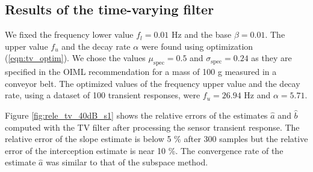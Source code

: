\subsection{Results of the time-varying filter}

We fixed the frequency lower value $f_l=0.01$ Hz and the base $\beta = 0.01$. 
The upper value $f_u$ and the decay rate $\alpha$ were found using optimization (\ref{eqn:tv_optim}). 
We chose the values $\mu_{\mathrm{spec}}=0.5$ and $\sigma_{\mathrm{spec}}=0.24$ as they are specified in the OIML recommendation \cite{OIML_R51_1} for a mass of 100 g measured in a conveyor belt.
The optimized values of the frequency upper value and the decay rate, using a dataset of 100 transient responses, were $f_u = 26.94$ Hz and $\alpha = 5.71$.

Figure \ref{fig:rele_tv_40dB_s1} shows the relative errors of the estimates $\widehat{a}$ and $\widehat{b}$ computed with the TV filter after processing the sensor transient response.
The relative error of the slope estimate is below 5 \% after 300 samples but the relative error of the interception estimate is near 10 \%.
The convergence rate of the estimate $\widehat{a}$ was similar to that of the subspace method.

